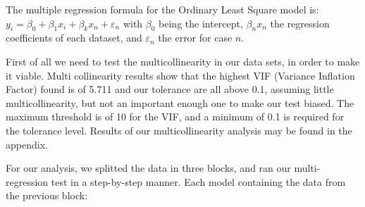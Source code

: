 \documentclass[11pt]{report}
\begin{document}
The multiple regression formula for the Ordinary Least Square model is:\newline
$y_i = \beta_0 + \beta_1 x_i + \beta_k x_n + \varepsilon_n$ with $\beta_0$ being the intercept, $\beta_n x_n$ the regression coefficients of each dataset, and $\varepsilon_n$ the error for case $n$. \newline

First of all we need to test the multicollinearity in our data sets, in order to make it viable. Multi collinearity results show that the highest VIF  (Variance Inflation Factor) found is of 5.711 and our tolerance are all above 0.1, assuming little multicollinearity, but not an important enough one to make our test biased. The maximum threshold is of 10 \cite{BOWERMAN} for the VIF, and a minimum of 0.1 is required for the tolerance level\cite{MYERS}.  
Results of our multicollinearity analysis may be found in the appendix.\smallbreak

For our analysis, we splitted the data in three blocks, and ran our multi-regression test in a step-by-step manner. Each model containing the data from the previous block: \smallbreak
\end{document}
